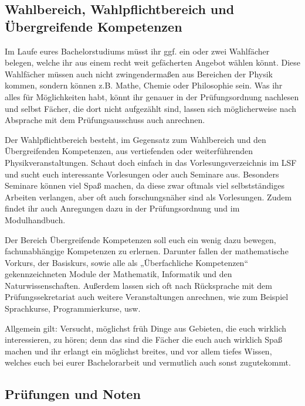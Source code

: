\subsection{Wahlbereich, Wahlpflichtbereich und \\Übergreifende Kompetenzen}

Im Laufe eures Bachelorstudiums müsst ihr ggf. ein oder zwei Wahlfächer belegen, welche ihr aus einem recht weit gefächerten Angebot wählen könnt. Diese Wahlfächer müssen auch nicht zwingendermaßen aus Bereichen der Physik kommen, sondern können z.B. Mathe, Chemie oder Philosophie sein. Was ihr alles für Möglichkeiten habt, könnt ihr genauer in der Prüfungsordnung nachlesen und selbst Fächer, die dort nicht aufgezählt sind, lassen sich möglicherweise nach Absprache mit dem Prüfungsausschuss auch anrechnen.

Der Wahlpflichtbereich besteht, im Gegensatz zum Wahlbereich und den Übergreifenden Kompetenzen, aus vertiefenden oder weiterführenden Physikveranstaltungen. Schaut doch einfach in das Vorlesungsverzeichnis im LSF und sucht euch interessante Vorlesungen oder auch Seminare aus. Besonders Seminare können viel Spaß machen, da diese zwar oftmals viel selbstständiges Arbeiten verlangen, aber oft auch forschungsnäher sind als Vorlesungen. Zudem findet ihr auch Anregungen dazu in der Prüfungsordnung und im Modulhandbuch.

Der Bereich Übergreifende Kompetenzen soll euch ein wenig dazu bewegen, fachunabhängige Kompetenzen zu erlernen. Darunter fallen der mathematische Vorkurs, der Basiskurs, sowie alle als „Überfachliche Kompetenzen“ gekennzeichneten Module der Mathematik, Informatik und den Naturwissenschaften. Außerdem lassen sich oft nach Rücksprache mit dem Prüfungssekretariat auch weitere Veranstaltungen anrechnen, wie zum Beispiel Sprachkurse, Programmierkurse, usw.

Allgemein gilt: Versucht, möglichst früh Dinge aus Gebieten, die euch wirklich interessieren, zu hören; denn das sind die Fächer die euch auch wirklich Spaß machen und ihr erlangt ein möglichst breites, und vor allem tiefes Wissen, welches euch bei eurer Bachelorarbeit und vermutlich auch sonst zugutekommt.

\subsection{Prüfungen und Noten}

